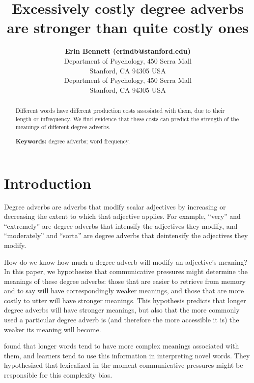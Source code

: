\documentclass[10pt,letterpaper]{article}
\title{Excessively costly degree adverbs are stronger than quite costly ones}
\author{
{\large \bf Erin Bennett (erindb@stanford.edu)} \\
  Department of Psychology, 450 Serra Mall \\
  Stanford, CA 94305 USA
  \AND {\large \bf Noah D. Goodman (ngoodman@stanford.edu)} \\
  Department of Psychology, 450 Serra Mall \\
  Stanford, CA 94305 USA
  }
\begin{document}
\maketitle

\begin{abstract}
Different words have different production costs assosiated with them, due to their length or infrequency. We find evidence that these costs can predict the strength of the meanings of different degree adverbs.

\textbf{Keywords:} 
degree adverbs; word frequency.
\end{abstract}

\section{Introduction}

Degree adverbs are adverbs that modify scalar adjectives by increasing or decreasing the extent to which that adjective applies. For example, ``very'' and ``extremely'' are degree adverbs that intensify the adjectives they modify, and ``moderately'' and ``sorta'' are degree adverbs that deintensify the adjectives they modify.

How do we know how much a degree adverb will modify an adjective's meaning? In this paper, we hypothesize that communicative pressures might determine the meanings of these degree adverbs: those that are easier to retrieve from memory and to say will have correspondingly weaker meanings, and those that are more costly to utter will have stronger meanings. This hypothesis predicts that longer degree adverbs will have stronger meanings, but also that the more commonly used a particular degree adverb is (and therefore the more accessible it is) the weaker its meaning will become.

 found that longer words tend to have more complex meanings associated with them, and learners tend to use this information in interpreting novel words. They hypothesized that lexicalized in-the-moment communicative pressures might be responsible for this complexity bias.
\end{document}

